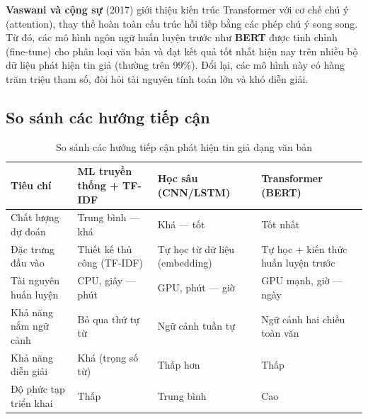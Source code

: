 \textbf{Vaswani và cộng sự} (2017) \cite{transformer} giới thiệu kiến trúc Transformer với cơ chế chú ý (attention), thay thế hoàn toàn cấu trúc hồi tiếp bằng các phép chú ý song song. Từ đó, các mô hình ngôn ngữ huấn luyện trước như \textbf{BERT} \cite{bert} được tinh chỉnh (fine-tune) cho phân loại văn bản và đạt kết quả tốt nhất hiện nay trên nhiều bộ dữ liệu phát hiện tin giả (thường trên 99\%). Đổi lại, các mô hình này có hàng trăm triệu tham số, đòi hỏi tài nguyên tính toán lớn và khó diễn giải.

\subsection{So sánh các hướng tiếp cận}

\begin{table}[H]
\centering
\caption{So sánh các hướng tiếp cận phát hiện tin giả dạng văn bản}
\label{tab:so-sanh-huong}
\begin{tabular}{|p{4cm}|p{3.4cm}|p{3.4cm}|p{3.4cm}|}
\hline
\textbf{Tiêu chí} & \textbf{ML truyền thống + TF-IDF} & \textbf{Học sâu (CNN/LSTM)} & \textbf{Transformer (BERT)} \\
\hline
Chất lượng dự đoán & Trung bình --- khá & Khá --- tốt & Tốt nhất \\
\hline
Đặc trưng đầu vào & Thiết kế thủ công (TF-IDF) & Tự học từ dữ liệu (embedding) & Tự học + kiến thức huấn luyện trước \\
\hline
Tài nguyên huấn luyện & CPU, giây --- phút & GPU, phút --- giờ & GPU mạnh, giờ --- ngày \\
\hline
Khả năng nắm ngữ cảnh & Bỏ qua thứ tự từ & Ngữ cảnh tuần tự & Ngữ cảnh hai chiều toàn văn \\
\hline
Khả năng diễn giải & Khá (trọng số từ) & Thấp hơn & Thấp \\
\hline
Độ phức tạp triển khai & Thấp & Trung bình & Cao \\
\hline
\end{tabular}
\end{table}

